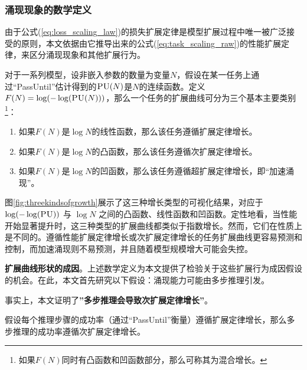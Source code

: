 \subsubsection{涌现现象的数学定义}
由于公式(\ref{eq:loss_scaling_law})的损失扩展定律是模型扩展过程中唯一被广泛接受的原则，本文依据由它推导出来的公式(\ref{eq:task_scaling_raw})的性能扩展定律，来区分涌现现象和其他扩展行为。


对于一系列模型，设非嵌入参数的数量为变量\(N\)，假设在某一任务上通过“PassUntil”估计得到的\(\textsc{PU}(N)\)是\(N\)的连续函数。定义\(F(N) = \operatorname{log}(-\operatorname{log}(\textsc{PU}(N)))\)，{那么一个任务的扩展曲线可分为三个基本主要类别\footnote{如果\(F(N)\)同时有凸函数和凹函数部分，那么可称其为混合增长。}：}
\begin{enumerate}
    \item 如果\(F(N)\)是\(\operatorname{log}N\)的线性函数，那么该任务遵循扩展定律增长。
    \item 如果\(F(N)\)是\(\operatorname{log}N\)的凸函数，那么该任务遵循次扩展定律增长。
    \item 如果\(F(N)\)是\(\operatorname{log}N\)的凹函数，那么该任务遵循超扩展定律增长，即“加速涌现”。
\end{enumerate}


图\ref{fig:threekindsofgrowth}展示了这三种增长类型的可视化结果，对应于 $\log(-\log(\textsc{PU}))$ 与 $\log N$ 之间的凸函数、线性函数和凹函数。定性地看，当性能开始显著提升时，这三种类型的扩展曲线都类似于指数增长。然而，它们在性质上是不同的。遵循性能扩展定律增长或次扩展定律增长的任务扩展曲线更容易预测和控制，而加速涌现则不易预测，并且随着模型规模增大可能会失控。

{\textbf{扩展曲线形状的成因}。上述数学定义为本文提供了检验关于这些扩展行为成因假设的机会。在此，本文首先研究以下假设：涌现能力可能由多步推理引发\citep{srivastava2022beyond, wei2022emergent, schaeffer2023emergent}。}

事实上，本文证明了\textbf{”多步推理会导致次扩展定律增长”}。

\begin{theorem}
假设每个推理步骤的成功率（通过“PassUntil”衡量）遵循扩展定律增长，那么多步推理的成功率遵循次扩展定律增长。
\end{theorem}


